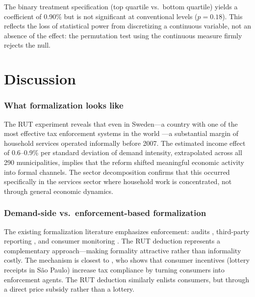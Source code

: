 \documentclass[12pt]{article}
\begin{document}
The binary treatment specification (top quartile vs.\ bottom quartile) yields a coefficient of 0.90\% but is not significant at conventional levels ($p = 0.18$). This reflects the loss of statistical power from discretizing a continuous variable, not an absence of the effect: the permutation test using the continuous measure firmly rejects the null.


\section{Discussion}

\subsubsection*{What formalization looks like} The RUT experiment reveals that even in Sweden---a country with one of the most effective tax enforcement systems in the world \citep{kleven2011unwilling}---a substantial margin of household services operated informally before 2007. The estimated income effect of 0.6--0.9\% per standard deviation of demand intensity, extrapolated across all 290 municipalities, implies that the reform shifted meaningful economic activity into formal channels. The sector decomposition confirms that this occurred specifically in the services sector where household work is concentrated, not through general economic dynamics.

\subsubsection*{Demand-side vs.\ enforcement-based formalization} The existing formalization literature emphasizes enforcement: audits \citep{kleven2011unwilling}, third-party reporting \citep{pomeranz2015no}, and consumer monitoring \citep{naritomi2019consumers}. The RUT deduction represents a complementary approach---making formality attractive rather than informality costly. The mechanism is closest to \citet{naritomi2019consumers}, who shows that consumer incentives (lottery receipts in S\~{a}o Paulo) increase tax compliance by turning consumers into enforcement agents. The RUT deduction similarly enlists consumers, but through a direct price subsidy rather than a lottery.
\end{document}
